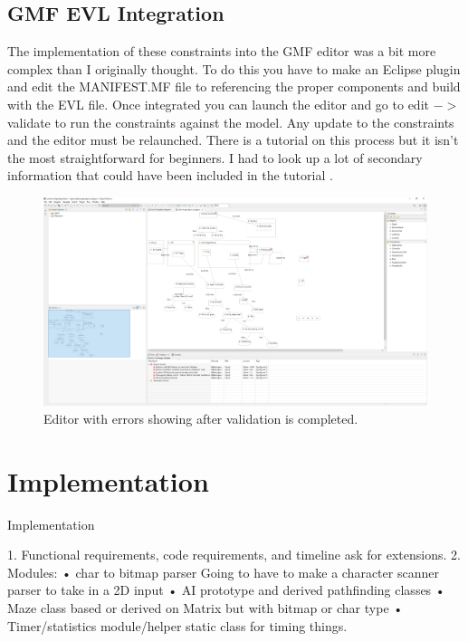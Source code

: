 \documentclass[letterpaper,12pt]{article}  %
\begin{document}
\subsection{GMF EVL Integration}
The implementation of these constraints into the GMF editor was a bit more complex than I originally thought. To do this you have to make an Eclipse plugin and edit the MANIFEST.MF file to referencing the proper components and build with the EVL file. Once integrated you can launch the editor and go to edit $->$ validate to run the constraints against the model. Any update to the constraints and the editor must be relaunched. There is a tutorial on this process \cite{noauthor_live_nodate} but it isn’t the most straightforward for beginners. I had to look up a lot of secondary information that could have been included in the tutorial \cite{noauthor_eclipse_nodate}.

\begin{figure}[h]  %
    \centering  %
    \includegraphics[width = 12 cm ]{Editor with Constraints.png}
    \caption{Editor with errors showing after validation is completed.}
    \label{fig:errors}
\end{figure}

\newpage


\section{Implementation}
Implementation


1. Functional requirements, code requirements, and timeline ask for extensions. 
2. Modules: 
• char to bitmap parser
Going to have to make a character scanner parser to take in a 2D input
• AI prototype and derived pathfinding classes
• Maze class based or derived on Matrix but with bitmap or char type
• Timer/statistics module/helper static class for timing things.
\end{document}
